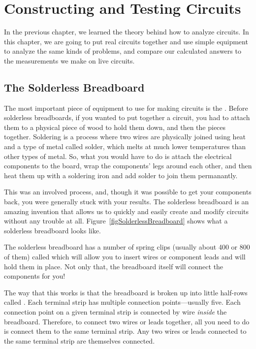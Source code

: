 \chapter{Constructing and Testing Circuits}
\label{chapConstructingTesting}


In the previous chapter, we learned the theory behind how to analyze circuits.
In this chapter, we are going to put real circuits together and use simple equipment to analyze the same kinds of problems, and compare our calculated answers to the measurements we make on live circuits.

\section{The Solderless Breadboard}

The most important piece of equipment to use for making circuits is the .
Before solderless breadboards, if you wanted to put together a circuit, you had to attach them to a physical piece of wood to hold them down, and then  the pieces together.
Soldering is a process where two wires are physically joined using heat and a type of metal called solder, which melts at much lower temperatures than other types of metal.
So, what you would have to do is attach the electrical components to the board, wrap the components' legs around each other, and then heat them up with a soldering iron and add solder to join them permanantly.

This was an involved process, and, though it was possible to get your components back, you were generally stuck with your results.
The solderless breadboard is an amazing invention that allows us to quickly and easily create and modify circuits without any trouble at all.
Figure~\ref{figSolderlessBreadboard} shows what a solderless breadboard looks like.


The solderless breadboard has a number of spring clips (usually about 400 or 800 of them) called  which will allow you to insert wires or component leads and will hold them in place.
Not only that, the breadboard itself will connect the components for you!

The way that this works is that the breadboard is broken up into little half-rows called .
Each terminal strip has multiple connection points---usually five.
Each connection point on a given terminal strip is connected by wire \emph{inside} the breadboard.
Therefore, to connect two wires or leads together, all you need to do is connect them to the same terminal strip.
Any two wires or leads connected to the same terminal strip are themselves connected.


